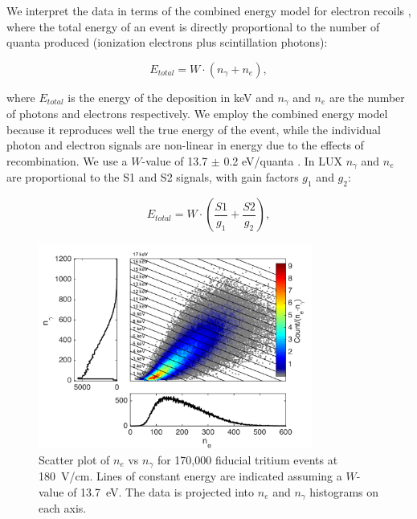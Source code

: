 We interpret the data in terms of the combined energy model for electron recoils \cite{Platzman}, where the total energy of an event is directly proportional to the number of quanta produced (ionization electrons plus scintillation photons):

\begin{equation}
E_{total} = W \cdot (n_{\gamma} + n_e ),
\label{platzman_eq}
\end{equation}

\noindent
where $E_{total}$ is the energy of the deposition in keV and  $n_\gamma$ and $n_e$ are the number of photons and electrons respectively. We employ the combined energy model because it reproduces well the true energy of the event, while the individual photon and electron signals are non-linear in energy due to the effects of recombination. We use a $W$-value of 13.7 $\pm$ 0.2 eV/quanta \cite{Dahl_Thesis}. In LUX $n_{\gamma}$ and $n_e$ are proportional to the S1 and S2 signals, with gain factors $g_1$ and $g_2$: 

\begin{equation}
E_{total} = W \cdot \left(\frac{S1}{g_1} + \frac{S2}{g_2} \right),
\label{energy_eq}
\end{equation}

\noindent
{} 

\begin{figure}[h!]
\includegraphics[width=90mm]{fig/tritium_scatter.png}
\caption{Scatter plot of $n_e$ vs $n_{\gamma}$ for 170,000 fiducial tritium events at 180~V/cm. Lines of constant energy are indicated assuming a $W$-value of 13.7~eV. The data is projected into $n_e$ and $n_{\gamma}$ histograms on each axis.}
\label{fig:tritium-scatter}
\end{figure}


